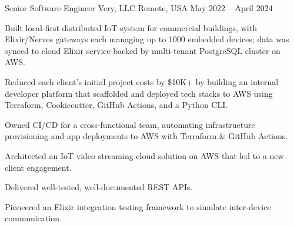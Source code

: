 \begin{cventries}
	\cventry
	{Senior Software Engineer} %
	{Very, LLC} %
	{Remote, USA} %
	{May 2022 -- April 2024} %
	{
		\begin{cvitems}
			\item Built local-first distributed IoT system for commercial buildings,
			with Elixir/Nerves gateways each managing up to 1000 embedded devices;
			data was synced to cloud Elixir service backed by multi-tenant PostgreSQL
			cluster on AWS.
			\item Reduced each client's initial project costs by \$10K+ by building
			an internal developer platform that scaffolded and deployed tech stacks
			to AWS using Terraform, Cookiecutter, GitHub Actions, and a Python CLI.
			\item Owned CI/CD for a cross-functional team, automating infrastructure
			provisioning and app deployments to AWS with Terraform \& GitHub
			Actions.
			\item Architected an IoT video streaming cloud solution on AWS that
			led to a new client engagement.
			\columnbreak
			\item Delivered well-tested, well-documented REST APIs.
			\item Pioneered an Elixir integration testing framework to simulate
			inter-device communication.

\end{cvitems}}
\end{cventries}
